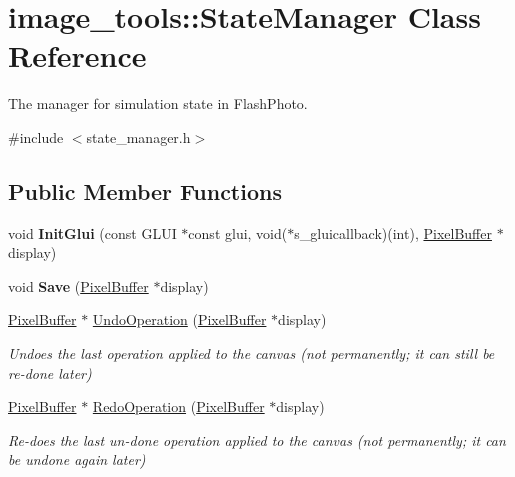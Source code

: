 \hypertarget{classimage__tools_1_1StateManager}{}\section{image\+\_\+tools\+:\+:State\+Manager Class Reference}
\label{classimage__tools_1_1StateManager}


The manager for simulation state in Flash\+Photo.  




{\ttfamily \#include $<$state\+\_\+manager.\+h$>$}

\subsection*{Public Member Functions}
\begin{DoxyCompactItemize}
\item 
void {\bfseries Init\+Glui} (const G\+L\+UI $\ast$const glui, void($\ast$s\+\_\+gluicallback)(int), \hyperlink{classimage__tools_1_1PixelBuffer}{Pixel\+Buffer} $\ast$display)\hypertarget{classimage__tools_1_1StateManager_ae21d58ebf1d69077c1d9056a56e04e86}{}\label{classimage__tools_1_1StateManager_ae21d58ebf1d69077c1d9056a56e04e86}

\item 
void {\bfseries Save} (\hyperlink{classimage__tools_1_1PixelBuffer}{Pixel\+Buffer} $\ast$display)\hypertarget{classimage__tools_1_1StateManager_a7cc038e0f4f66f5a3a876ffa341af59c}{}\label{classimage__tools_1_1StateManager_a7cc038e0f4f66f5a3a876ffa341af59c}

\item 
\hyperlink{classimage__tools_1_1PixelBuffer}{Pixel\+Buffer} $\ast$ \hyperlink{classimage__tools_1_1StateManager_a369d6cf8cc21eba158be014c668d48e2}{Undo\+Operation} (\hyperlink{classimage__tools_1_1PixelBuffer}{Pixel\+Buffer} $\ast$display)\hypertarget{classimage__tools_1_1StateManager_a369d6cf8cc21eba158be014c668d48e2}{}\label{classimage__tools_1_1StateManager_a369d6cf8cc21eba158be014c668d48e2}

\begin{DoxyCompactList}\small\item\em Undoes the last operation applied to the canvas (not permanently; it can still be re-\/done later) \end{DoxyCompactList}\item 
\hyperlink{classimage__tools_1_1PixelBuffer}{Pixel\+Buffer} $\ast$ \hyperlink{classimage__tools_1_1StateManager_a1fddcb9b8336a20f1c89026d46f6cc9a}{Redo\+Operation} (\hyperlink{classimage__tools_1_1PixelBuffer}{Pixel\+Buffer} $\ast$display)\hypertarget{classimage__tools_1_1StateManager_a1fddcb9b8336a20f1c89026d46f6cc9a}{}\label{classimage__tools_1_1StateManager_a1fddcb9b8336a20f1c89026d46f6cc9a}

\begin{DoxyCompactList}\small\item\em Re-\/does the last un-\/done operation applied to the canvas (not permanently; it can be undone again later) \end{DoxyCompactList}\end{DoxyCompactItemize}
